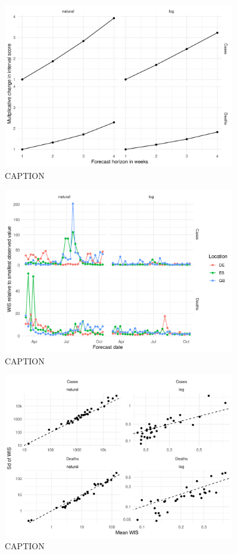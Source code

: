 \documentclass{article}
\begin{document}
\begin{figure}[h!]
    \centering
    \includegraphics[width=0.9\textwidth]{output/figures/HUB-scores-over-horizon.png}
    \caption{CAPTION}
    \label{fig:HUB-scores-horizon}
\end{figure}

\begin{figure}[h!]
    \centering
    \includegraphics[width=0.9\textwidth]{output/figures/HUB-scores-over-time.png}
    \caption{CAPTION}
    \label{fig:HUB-scores-time}
\end{figure}

\begin{figure}[h!]
    \centering
    \includegraphics[width=0.9\textwidth]{output/figures/HUB-sd-vs-mean-scores.png}
    \caption{CAPTION}
    \label{fig:HUB-mean-sd-scores}
\end{figure}
\end{document}
